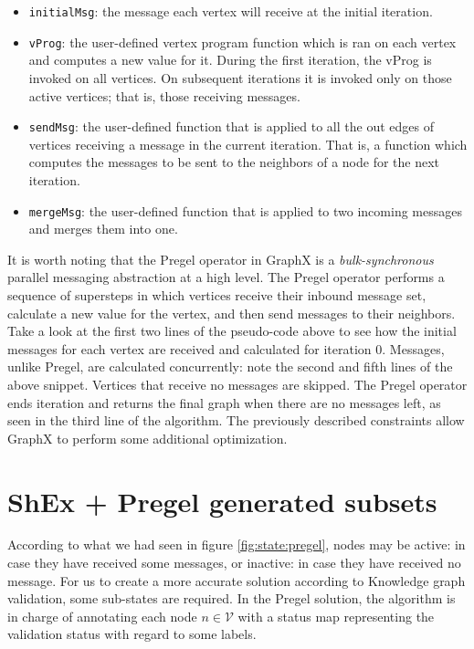 \begin{itemize}
    \item \texttt{initialMsg}: the message each vertex will receive at the initial iteration.
    \item \texttt{vProg}: the user-defined vertex program function which is ran on each vertex and computes a new value for it. During the first iteration, the vProg is invoked on all vertices. On subsequent iterations it is invoked only on those active vertices; that is, those receiving messages.
    \item \texttt{sendMsg}: the user-defined function that is applied to all the out edges of vertices receiving a message in the current iteration. That is, a function which computes the messages to be sent to the neighbors of a node for the next iteration.
    \item \texttt{mergeMsg}: the user-defined function that is applied to two incoming messages and merges them into one.
\end{itemize}

\begin{pseudocode}
    
\end{pseudocode}

It is worth noting that the Pregel operator in GraphX is a \textit{bulk-synchronous} parallel messaging abstraction at a high level. The Pregel operator performs a sequence of supersteps in which vertices receive their inbound message set, calculate a new value for the vertex, and then send messages to their neighbors. Take a look at the first two lines of the pseudo-code above to see how the initial messages for each vertex are received and calculated for iteration 0. Messages, unlike Pregel, are calculated concurrently: note the second and fifth lines of the above snippet. Vertices that receive no messages are skipped. The Pregel operator ends iteration and returns the final graph when there are no messages left, as seen in the third line of the algorithm. The previously described constraints allow GraphX to perform some additional optimization.

\section{ShEx + Pregel generated subsets}

According to what we had seen in figure \ref{fig:state:pregel}, nodes may be active: in case they have received some messages, or inactive: in case they have received no message. For us to create a more accurate solution according to Knowledge graph validation, some sub-states are required. In the Pregel solution, the algorithm is in charge of annotating each node $n\in\mathcal{V}$ with a status map representing the validation status with regard to some labels.

